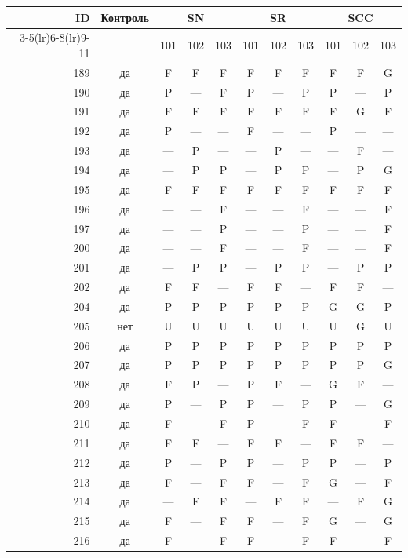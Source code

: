 \begin{table}[p]\centering\small
\begin{tabular*}{\textwidth}{@{\extracolsep{\fill}}rc*{9}{c}@{}}\toprule
ID & Контроль & \multicolumn{3}{c}{SN} & \multicolumn{3}{c}{SR} & \multicolumn{3}{c}{SCC}\\
\cmidrule(lr){3-5}\cmidrule(lr){6-8}\cmidrule(lr){9-11}
 & & 101 & 102 & 103 & 101 & 102 & 103 & 101 & 102 & 103\\\midrule
189 & да & F & F & F & F & F & F & F & F & G\\
190 & да & P & — & F & P & — & P & P & — & P\\
191 & да & F & F & F & F & F & F & F & G & F\\
192 & да & P & — & — & F & — & — & P & — & —\\
193 & да & — & P & — & — & P & — & — & F & —\\
194 & да & — & P & P & — & P & P & — & P & G\\
195 & да & F & F & F & F & F & F & F & F & F\\
196 & да & — & — & F & — & — & F & — & — & F\\
197 & да & — & — & P & — & — & P & — & — & F\\
200 & да & — & — & F & — & — & F & — & — & F\\
201 & да & — & P & P & — & P & P & — & P & P\\
202 & да & F & F & — & F & F & — & F & F & —\\
204 & да & P & P & P & P & P & P & G & G & P\\
205 & нет & U & U & U & U & U & U & U & G & U\\
206 & да & P & P & P & P & P & P & P & P & P\\
207 & да & P & P & P & P & P & P & P & P & G\\
208 & да & F & P & — & P & F & — & G & F & —\\
209 & да & P & — & P & P & — & P & P & — & G\\
210 & да & F & — & F & P & — & F & F & — & F\\
211 & да & F & F & — & F & F & — & F & F & —\\
212 & да & P & — & P & P & — & P & P & — & P\\
213 & да & F & — & F & F & — & F & G & — & F\\
214 & да & — & F & F & — & F & F & — & F & G\\
215 & да & F & — & F & F & — & F & G & — & G\\
216 & да & F & — & F & F & — & F & F & — & F\\

\end{tabular*}
\end{table}
